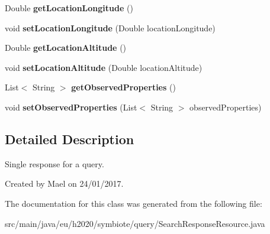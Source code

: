 \begin{DoxyCompactItemize}
\item 
Double {\bfseries get\+Location\+Longitude} ()\hypertarget{classeu_1_1h2020_1_1symbiote_1_1query_1_1SearchResponseResource_a6dc65e2054edde99e488199b21c2dbea}{}\label{classeu_1_1h2020_1_1symbiote_1_1query_1_1SearchResponseResource_a6dc65e2054edde99e488199b21c2dbea}

\item 
void {\bfseries set\+Location\+Longitude} (Double location\+Longitude)\hypertarget{classeu_1_1h2020_1_1symbiote_1_1query_1_1SearchResponseResource_ae5b89a286f54a9118916ede8e23180b7}{}\label{classeu_1_1h2020_1_1symbiote_1_1query_1_1SearchResponseResource_ae5b89a286f54a9118916ede8e23180b7}

\item 
Double {\bfseries get\+Location\+Altitude} ()\hypertarget{classeu_1_1h2020_1_1symbiote_1_1query_1_1SearchResponseResource_af63e588b34554c25eaaa0e0299972bf2}{}\label{classeu_1_1h2020_1_1symbiote_1_1query_1_1SearchResponseResource_af63e588b34554c25eaaa0e0299972bf2}

\item 
void {\bfseries set\+Location\+Altitude} (Double location\+Altitude)\hypertarget{classeu_1_1h2020_1_1symbiote_1_1query_1_1SearchResponseResource_a5ced25d930ab4e626e83c2694910eb8d}{}\label{classeu_1_1h2020_1_1symbiote_1_1query_1_1SearchResponseResource_a5ced25d930ab4e626e83c2694910eb8d}

\item 
List$<$ String $>$ {\bfseries get\+Observed\+Properties} ()\hypertarget{classeu_1_1h2020_1_1symbiote_1_1query_1_1SearchResponseResource_a324f113a00a6efe96fb0f12de75ddb72}{}\label{classeu_1_1h2020_1_1symbiote_1_1query_1_1SearchResponseResource_a324f113a00a6efe96fb0f12de75ddb72}

\item 
void {\bfseries set\+Observed\+Properties} (List$<$ String $>$ observed\+Properties)\hypertarget{classeu_1_1h2020_1_1symbiote_1_1query_1_1SearchResponseResource_a6dbd57313f4ae304085d1ed1ad6d850f}{}\label{classeu_1_1h2020_1_1symbiote_1_1query_1_1SearchResponseResource_a6dbd57313f4ae304085d1ed1ad6d850f}

\end{DoxyCompactItemize}


\subsection{Detailed Description}
Single response for a query.

Created by Mael on 24/01/2017. 

The documentation for this class was generated from the following file\+:\begin{DoxyCompactItemize}
\item 
src/main/java/eu/h2020/symbiote/query/Search\+Response\+Resource.\+java\end{DoxyCompactItemize}
